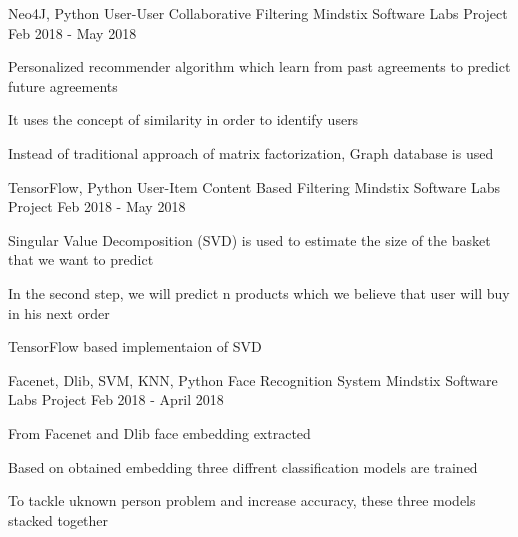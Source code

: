\begin{cventries}
   \cventry
    {Neo4J, Python} %
    {User-User Collaborative Filtering} %
    {Mindstix Software Labs Project} %
    {Feb 2018 - May 2018} %
    {
      \begin{cvitems} %
        \item {Personalized recommender algorithm which learn from past agreements to predict future agreements}
        \item {It uses the concept of similarity in order to identify users}
        \item {Instead of traditional approach of matrix factorization, Graph database is used}
      \end{cvitems}
    }
  
   \cventry
    {TensorFlow, Python} %
    {User-Item Content Based Filtering} %
    {Mindstix Software Labs Project} %
    {Feb 2018 - May 2018} %
    {
      \begin{cvitems} %
        \item {Singular Value Decomposition (SVD) is used to estimate the size of the basket that we want to predict}
        \item {In the second step, we will predict n products which we believe that user will buy in his next order}
        \item {TensorFlow based implementaion of SVD}
      \end{cvitems}
    }
   
   \cventry
    {Facenet, Dlib, SVM, KNN, Python} %
    {Face Recognition System} %
    {Mindstix Software Labs Project} %
    {Feb 2018 - April 2018} %
    {
      \begin{cvitems} %
        \item {From Facenet and Dlib face embedding extracted}
        \item {Based on obtained embedding three diffrent classification models are trained }
        \item {To tackle uknown person problem and increase accuracy, these three models stacked together}
      \end{cvitems}
    }



\end{cventries}
